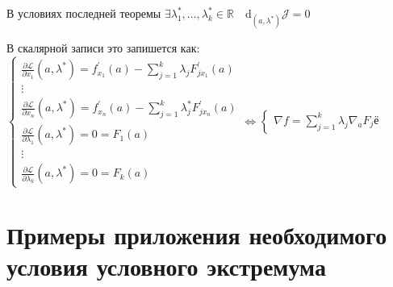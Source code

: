 \documentclass{book}
\newcommand\R{\ensuremath{\mathbb{R}}}
\newcommand{\p}[1]{#1^{\prime}}
\theoremstyle{definition}
\begin{document}
\begin{theorem}

    В условиях последней теоремы $\exists \lambda_1^*, \ldots, \lambda_k^*\in \R\quad \mathrm d_{\left( a, \lambda^* \right) } \mathcal J = 0$

    В скалярной записи это запишется как:
    $\begin{cases}
        \frac{\partial \mathcal L}{\partial x_1}\left( a, \lambda^* \right)  = \p f_{x_1}(a) - \sum_{j=1}^{k} \lambda_j \p F_{jx_1}(a)\\
        \vdots\\
        \frac{\partial \mathcal L}{\partial x_n}\left( a, \lambda^* \right)  = \p f_{x_{n}}(a) - \sum_{j=1}^{k} \lambda_j^*\p F_{jx_{n} }(a)\\ \hline
        \frac{\partial \mathcal L}{\partial \lambda_1}\left( a, \lambda^* \right) = 0 = F_1(a)\\
        \vdots\\
        \frac{\partial \mathcal L}{\partial \lambda_k}\left( a, \lambda^* \right) = 0 =F_k(a)
    \end{cases} \iff  \begin{cases}
        \nabla f = \sum_{j=1}^{k} \lambda_j \nabla _aF_jё
    \end{cases}$
\end{theorem}

\section{Примеры приложения необходимого условия условного экстремума}
\end{document}
